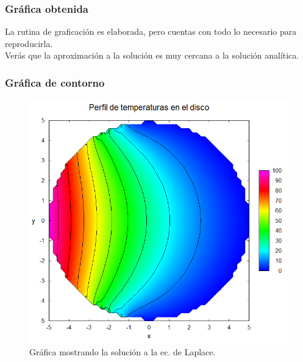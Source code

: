 \begin{frame}
\frametitle{Gráfica obtenida}
La rutina de graficación es elaborada, pero cuentas con todo lo necesario para reproducirla.
\\
\bigskip
\pause
Verás que la aproximación a la solución es muy cercana a la solución analítica.
\end{frame}
\begin{frame}
\frametitle{Gráfica de contorno}
\begin{figure}[h!]
   \centering
   \includegraphics[scale=0.35]{Imagenes/ejercicio_Poisson2D_Plato_Circular_01.png}  
   \caption{Gráfica mostrando la solución a la ec. de Laplace.}
\end{figure}
\end{frame}

